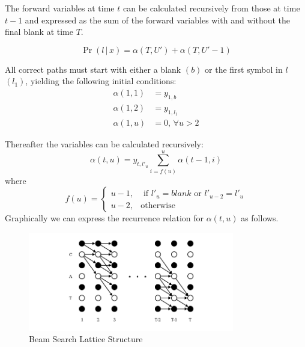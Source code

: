 The forward variables at time $t$ can be calculated recursively from those at time $t - 1$ and expressed as the sum of the forward variables with and without the final blank at time $T$.

\begin{equation}
\Pr( l \, | \, x) = \alpha(T, U') + \alpha(T, U' - 1)
\label{eqn_c3_ctc05}
\end{equation}

All correct paths must start with either a blank $(b)$ or the first symbol in $l$ $(l_1)$, yielding the following initial conditions:
\begin{equation}
\begin{aligned}\alpha(1, 1) &= y_{1,b} \\ \alpha(1, 2) &= y_{1,l_1} \\ \alpha(1, u) &= 0, \, \forall u > 2 \end{aligned}
\label{eqn_c3_ctc05}\end{equation}

Thereafter the variables can be calculated recursively:
\begin{equation}
\alpha(t,u) = y_{t, l'_u} \sum_{i = f(u)}^{u} \alpha(t-1, i)
\label{eqn_c3_ctc06}\end{equation}
where
\begin{equation}
f(u) =\begin{cases}u-1, & \text{ if } l'_u = blank \text{ or } l'_{u-2} = l'_{u} \\ u-2, & \text{otherwise}\end{cases}
\label{eqn_c3_ctc07}\end{equation}
Graphically we can express the recurrence relation for $\alpha(t, u)$ as follows.

\begin{figure}
\centering
  \includegraphics[width=9cm]{thesis/images/Lattice.png}
  \caption{Beam Search Lattice Structure \citep{graves2006connectionist}}
\label{fig_3_a_lattice}
\end{figure}

